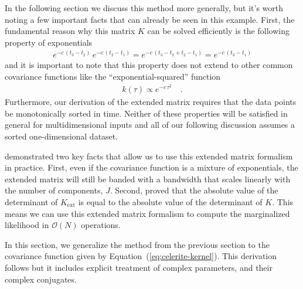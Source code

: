 \documentclass[manuscript, letterpaper]{aastex6}
\makeatletter
\let\origsubsection\subsection
\renewcommand\subsection{\@ifstar{\starsubsection}{\nostarsubsection}}
\newcommand\nostarsubsection[1]{\subsectionprelude\origsubsection{#1}}
\newcommand\starsubsection[1]{\subsectionprelude\origsubsection*{#1}}
\newcommand\subsectionprelude{\vspace{1em}}
\renewcommand{\eqref}[1]{\ref{eq:#1}}
\newcommand{\Eq}[1]{Equation~(\eqref{#1})}
\newcommand{\eq}[1]{\Eq{#1}}
\makeatother
\begin{document}
In the following section we discuss this method more generally, but it's
worth noting a few important facts that can already be seen in this example.
First, the fundamental reason why this matrix $K$ can be solved efficiently is
the following property of exponentials
\begin{eqnarray}
    e^{-c\,(t_3 - t_2)} \, e^{-c\,(t_2 - t_1)} =
    e^{-c\,(t_3 - t_2 + t_2 - t_1)} =
    e^{-c\,(t_3 - t_1)}
\end{eqnarray}
and it is important to note that this property does not extend to other common
covariance functions like the ``exponential-squared'' function
\begin{eqnarray}
    k(\tau) \propto e^{-c\,\tau^2} \quad.
\end{eqnarray}
Furthermore, our derivation of the extended matrix requires that the data
points be monotonically sorted in time.
Neither of these properties will be satisfied in general for multidimensional
inputs and all of our following discussion assumes a sorted
one-dimensional dataset.

\citet{Ambikasaran:2015} demonstrated two key facts that allow us to use this
extended matrix formalism in practice.
First, even if the covariance function is a mixture of exponentials, the
extended matrix will still be banded with a bandwidth that scales linearly
with the number of components, $J$.
Second, \citet{Ambikasaran:2015} proved that the absolute value of the
determinant of $K_\mathrm{ext}$ is equal to the absolute value of the
determinant of $K$.
This means we can use this extended matrix formalism to compute the
marginalized likelihood in $\mathcal{O}(N)$ operations.

\subsection{The algorithm}

In this section, we generalize the method from the previous section to the
covariance function given by \eq{celerite-kernel}.
This derivation follows \citet{Ambikasaran:2015} but it includes explicit
treatment of complex parameters, and their complex conjugates.
\end{document}
